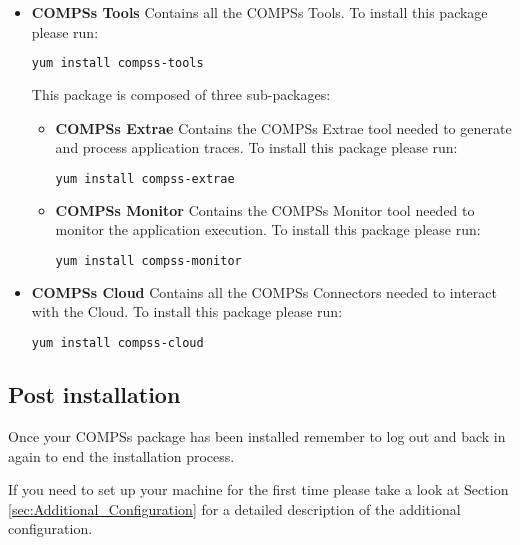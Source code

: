 \begin{itemize}
 \item \textbf{COMPSs Tools} \newline
       Contains all the COMPSs Tools.
       \newline
       To install this package please run:
       \begin{lstlisting}[language=bash]
	  yum install compss-tools
       \end{lstlisting}
       This package is composed of three sub-packages:
       \begin{itemize}
        \item \textbf{COMPSs Extrae} \newline
	      Contains the COMPSs Extrae tool needed to generate and process application traces.
	      \newline
	      To install this package please run:
	      \begin{lstlisting}[language=bash]
		  yum install compss-extrae
	      \end{lstlisting}
        \item \textbf{COMPSs Monitor} \newline
              Contains the COMPSs Monitor tool needed to monitor the application execution. 
              \newline
	      To install this package please run:
	      \begin{lstlisting}[language=bash]
		  yum install compss-monitor
	      \end{lstlisting}
       \end{itemize}

 \item \textbf{COMPSs Cloud} \newline
       Contains all the COMPSs Connectors needed to interact with the Cloud.
       \newline
       To install this package please run:
       \begin{lstlisting}[language=bash]
	  yum install compss-cloud
       \end{lstlisting}
\end{itemize} 

\subsection{Post installation}
Once your COMPSs package has been installed remember to log out and back in again to end the installation process.

If you need to set up your machine for the first time please take a look at Section \ref{sec:Additional_Configuration} for a 
detailed description of the additional configuration. 